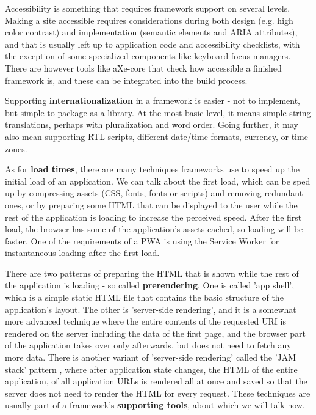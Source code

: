 \documentclass[english,odsaz]{fitthesis}
\begin{document}
Accessibility is something that requires framework support on several
levels. Making a site accessible requires considerations during both design
(e.g. high color contrast) and implementation (semantic elements and ARIA
attributes), and that is usually left up to application code and accessibility
checklists, with the exception of some specialized components like keyboard
focus managers. There are however tools like aXe-core that check how accessible
a finished framework is, and these can be integrated into the build process.

Supporting \textbf{internationalization} in a framework is easier - not to implement, but
simple to package as a library. At the most basic level, it means simple string
translations, perhaps with pluralization and word order. Going further, it may
also mean supporting RTL scripts, different date/time formats, currency, or time
zones.

As for \textbf{load times}, there are many techniques frameworks use to speed up the
initial load of an application. We can talk about the first load, which can be
sped up by compressing assets (CSS, fonts, fonts or scripts) and removing
redundant ones, or by preparing some HTML that can be displayed to the user
while the rest of the application is loading to increase the perceived
speed. After the first load, the browser has some of the application's assets
cached, so loading will be faster. One of the requirements of a PWA is using the
Service Worker for instantaneous loading after the first load.

There are two patterns of preparing the HTML that is shown while the rest of the
application is loading - so called \textbf{prerendering}. One is called 'app shell',
which is a simple static HTML file that contains the basic structure of the
application's layout. The other is 'server-side rendering', and it is a somewhat
more advanced technique where the entire contents of the requested URI is
rendered on the server including the data of the first page, and the browser
part of the application takes over only afterwards, but does not need to fetch
any more data. There is another variant of 'server-side rendering' called the
'JAM stack' pattern \cite{jamstack}, where after application state changes, the
HTML of the entire application, of all application URLs is rendered all at once
and saved so that the server does not need to render the HTML for every
request. These techniques are usually part of a framework's \textbf{supporting tools},
about which we will talk now.
\end{document}
